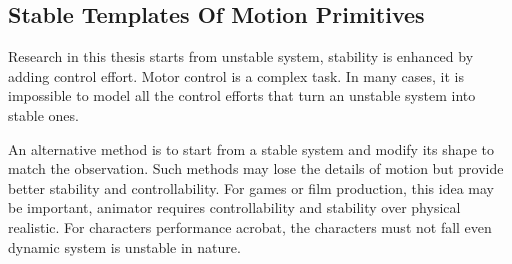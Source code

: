 \subsection{Stable Templates Of Motion Primitives}

Research in this thesis starts from unstable system,  stability is enhanced by adding control effort.
Motor control is a complex task. 
In many cases, it is impossible to model all the control efforts that turn an unstable system into stable ones.


An alternative method is to start from a stable system and modify its shape to match the observation.
Such methods may lose the details of motion but provide better stability and controllability. 
For games or film production, this idea may be important, animator requires controllability and stability over physical realistic.
For characters performance acrobat, the characters must not fall even dynamic system is unstable in nature.




